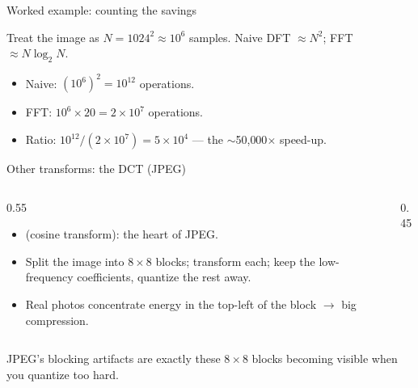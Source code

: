 \documentclass[10pt,aspectratio=169]{beamer}
\begin{document}
\begin{frame}{Worked example: counting the savings}
  \begin{mathbox}
    Treat the image as $N=1024^2\approx 10^6$ samples. Naive DFT $\approx N^2$; FFT $\approx N\log_2 N$.
  \end{mathbox}
  \begin{itemize}
    \item Naive: $(10^6)^2 = 10^{12}$ operations.
    \item FFT: $10^6 \times 20 = 2\times10^7$ operations.
    \item Ratio: $10^{12}/(2\times10^7) = 5\times10^4$ — the $\sim$50{,}000$\times$ speed-up.
  \end{itemize}
\end{frame}

\begin{frame}{Other transforms: the DCT (JPEG)}
  \begin{columns}[T]
    \begin{column}{0.55\textwidth}
      \begin{itemize}
        \item {} (cosine transform): the heart of JPEG.
        \item Split the image into $8\times8$ blocks; transform each; keep the low-frequency
              coefficients, quantize the rest away.
        \item Real photos concentrate energy in the top-left of the block $\rightarrow$ big compression.
      \end{itemize}
    \end{column}
    \begin{column}{0.45\textwidth}\begin{center}
    \end{center}\end{column}
  \end{columns}
  \begin{infobox}
    JPEG's blocking artifacts are exactly these $8\times8$ blocks becoming visible when you quantize
    too hard.
  \end{infobox}
\end{frame}
\end{document}
